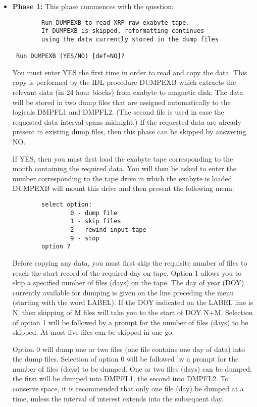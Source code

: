 \begin{itemize}
\item	{\bf Phase 1: }
This phase commences with the question:
\begin{verbatim}
        Run DUMPEXB to read XRP raw exabyte tape.
        If DUMPEXB is skipped, reformatting continues
        using the data currently stored in the dump files

 Run DUMPEXB (YES/NO) [def=NO]?
\end{verbatim}
You must enter YES the first time in order to read and copy the data. This copy
is performed by the IDL procedure DUMPEXB which extracts the relevant data (in
24 hour blocks) from exabyte to magnetic disk.  The data will be stored in two
dump files that are assigned automatically to the logicals DMPFL1 and  DMPFL2.
(The second file is used in case the requested data interval spans midnight.)
If the requested data are already present in existing dump files, then this
phase can be skipped by answering NO.

If YES, then you must first load  the exabyte tape corresponding to
the month containing the required data. You will then be asked to enter the
number corresponding to the tape drive in which the exabyte is loaded. DUMPEXB
will mount this drive and then present the following
menu:
\begin{verbatim}
        select option:
                0 - dump file
                1 - skip files
                2 - rewind input tape
                9 - stop
        option ?
\end{verbatim}
Before copying any data, you must first skip the requisite number of files to
reach the start record of the required day on tape. Option 1  allows you to
skip a specified number of files (days) on the tape.  The day of year (DOY)
currently available for dumping is given on the line  preceding the menu
(starting with the word LABEL). If  the DOY indicated on the  LABEL line is N,
then skipping of M files will take you to the start of  DOY N+M. Selection of
option 1 will be followed by a prompt for the number of  files (days) to be
skipped. At most five files can be skipped in one go.

Option 0 will dump one or two files (one file contains one day of data)  into
the dump files.  Selection of option 0 will be followed by a prompt for the
number of  files (days) to be dumped. One or two files (days) can be dumped;
the first will be dumped into  DMPFL1, the second into DMPFL2. To conserve
space, it is recommended that only one file (day) be dumped at a time,
unless the interval of interest extends into the subsequent day.


\end{itemize}
